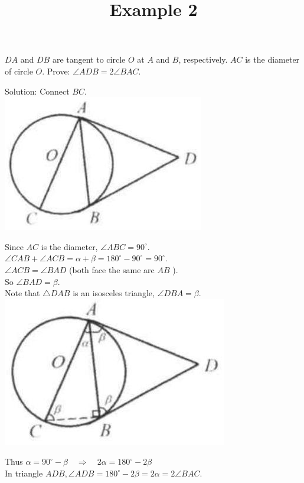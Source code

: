 \documentclass{article}
\title{Example 2}
\date{}
\begin{document}
\maketitle

\(D A\) and \(D B\) are tangent to circle \(O\) at \(A\) and \(B\), respectively. \(A C\) is the diameter of circle \(O\). Prove: \(\angle A D B=2 \angle B A C\).

Solution:
Connect \(B C\).\\
\centering
\includegraphics[width=\textwidth]{images/problem_image_1.jpg}

Since \(A C\) is the diameter, \(\angle A B C=90^{\circ}\).\\
\(\angle C A B+\angle A C B=\alpha+\beta=180^{\circ}-90^{\circ}=90^{\circ}\).\\
\(\angle A C B=\angle B A D\) (both face the same arc \(A B\) ).\\
So \(\angle B A D=\beta\).\\
Note that \(\triangle D A B\) is an isosceles triangle, \(\angle D B A=\beta\).\\
\centering
\includegraphics[width=\textwidth]{images/reasoning_image_1.jpg}

Thus \(\alpha=90^{\circ}-\beta \quad \Rightarrow \quad 2 \alpha=180^{\circ}-2 \beta\)\\
In triangle \(A D B, \angle A D B=180^{\circ}-2 \beta=2 \alpha=2 \angle B A C\).
\end{document}
